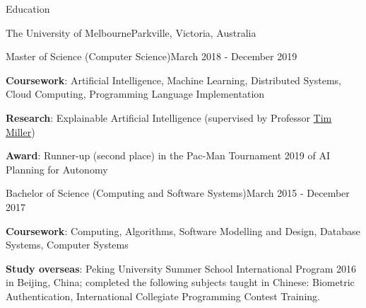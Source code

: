 \documentclass{xsha}
\begin{document}
\address{
\textbf{Phone} +86 136******** $\cdot$\space
\textbf{Email} \href{mailto:luo@jiahai.co}{luo@jiahai.co} $\cdot$\space
\textbf{LinkedIn} \href{https://linkedin.com/in/luojiahai/}{in/luojiahai} $\cdot$\space
\textbf{GitHub} \href{https://github.com/luojiahai/}{luojiahai} $\cdot$\space
\textbf{Site} \href{https://luojiahai.com/}{luojiahai.com}
}

\begin{xsection}{Education}

\begin{xheading}{The University of Melbourne}{Parkville, Victoria, Australia}
\begin{xsubheading}{Master of Science (Computer Science)}{March 2018 - December 2019}
\item \textbf{Coursework}: Artificial Intelligence, Machine Learning, Distributed Systems, Cloud Computing, Programming Language Implementation
\item \textbf{Research}: Explainable Artificial Intelligence (supervised by Professor \href{https://eecs.uq.edu.au/profile/9477/tim-miller}{Tim Miller})
\item \textbf{Award}: Runner-up (second place) in the Pac-Man Tournament 2019 of AI Planning for Autonomy
\end{xsubheading}
\begin{xsubheading}{Bachelor of Science (Computing and Software Systems)}{March 2015 - December 2017}
\item \textbf{Coursework}: Computing, Algorithms, Software Modelling and Design, Database Systems, Computer Systems
\item \textbf{Study overseas}: Peking University Summer School International Program 2016 in Beijing, China; completed the following subjects taught in Chinese: Biometric Authentication, International Collegiate Programming Contest Training.
\end{xsubheading}
\end{xheading}


\end{xsection}
\end{document}
